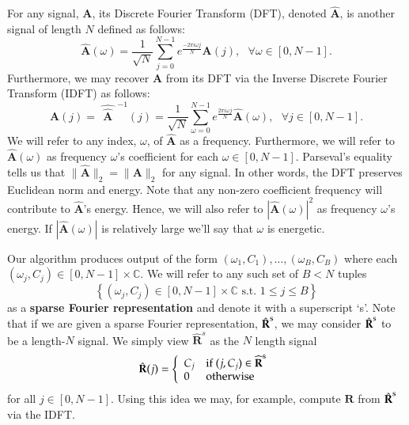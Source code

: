 \documentclass{article}
\begin{document}
For any signal, $\textbf{A}$, its Discrete Fourier Transform (DFT), denoted $\hat{\textbf{A}}$, is another signal of length $N$ defined as follows: 
$$\hat{\textbf{A}}(\omega) = \frac{1}{\sqrt{N}} \sum_{j=0}^{N-1} e^{\frac{-2 \pi i \omega j}{N}} \textbf{A}(j),~~~\forall \omega \in [0,N-1].$$
Furthermore, we may recover $\textbf{A}$ from its DFT via the Inverse Discrete Fourier Transform (IDFT) as follows:
$$\textbf{A}(j) = \widehat{~~\hat{\textbf{A}}~~}^{-1}(j) = \frac{1}{\sqrt{N}} \sum_{\omega=0}^{N-1} e^{\frac{2 \pi i \omega j}{N}} \hat{\textbf{A}}(\omega) ,~~~\forall j \in [0,N-1].$$
We will refer to any index, $\omega$, of $\hat{\textbf{A}}$ as a frequency.  Furthermore, we will refer to $\hat{\textbf{A}}(\omega)$ as frequency $\omega$'s 
coefficient for each $\omega \in [0,N-1]$.  Parseval's equality tells us that $\| \hat{\textbf{A}} \|_{2} = \| \textbf{A} \|_{2}$ for any signal.  In other words, the DFT 
preserves Euclidean norm and energy.  Note that any non-zero coefficient frequency will contribute to $\hat{\textbf{A}}$'s energy.  Hence, we will also refer to 
$| \hat{\textbf{A}}(\omega) |^{2}$ as frequency $\omega$'s energy.  If $| \hat{\textbf{A}}(\omega) |$ is relatively large we'll say that $\omega$ is energetic.

Our algorithm produces output of the form $(\omega_{1}, C_{1}), \dots, (\omega_{B}, C_{B})$ where each $(\omega_{j}, C_{j}) \in [0, N-1] \times \mathbb{C}$.  We will refer to any such set of $B < N$ tuples 
$$\left\{ (\omega_{j}, C_{j}) \in [0, N-1] \times \mathbb{C} \textrm{ s.t. } 1 \leq j \leq B \right\}$$ 
as a \textbf{sparse Fourier representation} and denote it with a superscript `s'.  Note that if we are given a sparse Fourier representation, $\hat{\textbf{R}}^{\rm s}$, we may consider $\hat{\textbf{R}}^{\rm s}$
to be a length-$N$ signal.  We simply view $\hat{\textbf{R}}^{s}$ as the $N$ length signal
$$\hat{\textbf{R}}(j) = \left\{ \begin{array}{ll} C_j & \textrm{if } (j,C_j) \in \widehat{\textbf{R}}^{\rm s} \\ 0 & {\rm otherwise} \end{array} \right.$$
for all $j \in [0,N-1]$.  Using this idea we may, for example, compute $\textbf{R}$ from $\hat{\textbf{R}}^{\rm s}$ via the IDFT.
\end{document}
